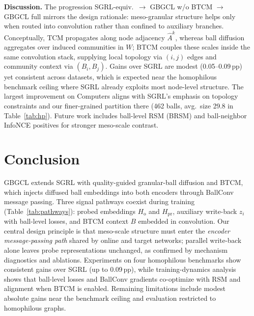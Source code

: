 \documentclass[conference]{IEEEtran}
\begin{document}
\textbf{Discussion.}
The progression SGRL-equiv.\ $\rightarrow$ GBGCL w/o BTCM $\rightarrow$ GBGCL full mirrors the design rationale: meso-granular structure helps only when routed into convolution rather than confined to auxiliary branches.
Conceptually, TCM propagates along node adjacency $\hat{A}^{k}$, whereas ball diffusion aggregates over induced communities in $W$; BTCM couples these scales inside the same convolution stack, supplying local topology via $(i,j)$ edges and community context via $(B_i,B_j)$.
Gains over SGRL are modest (0.05--0.09\,pp) yet consistent across datasets, which is expected near the homophilous benchmark ceiling where SGRL already exploits most node-level structure.
The largest improvement on Computers aligns with SGRL's emphasis on topology constraints and our finer-grained partition there (462 balls, avg.\ size 29.8 in Table~\ref{tab:hp}).
Future work includes ball-level RSM (BRSM) and ball-neighbor InfoNCE positives for stronger meso-scale contrast.

\section{Conclusion}
\label{sec:conclusion}

GBGCL extends SGRL with quality-guided granular-ball diffusion and BTCM, which injects diffused ball embeddings into both encoders through BallConv message passing.
Three signal pathways coexist during training (Table~\ref{tab:pathways}): probed embeddings $H_{\mathrm{o}}$ and $H_{\mathrm{pr}}$, auxiliary write-back $z_i$ with ball-level losses, and BTCM context $B$ embedded in convolution.
Our central design principle is that meso-scale structure must enter the \emph{encoder message-passing path} shared by online and target networks; parallel write-back alone leaves probe representations unchanged, as confirmed by mechanism diagnostics and ablations.
Experiments on four homophilous benchmarks show consistent gains over SGRL (up to 0.09\,pp), while training-dynamics analysis shows that ball-level losses and BallConv gradients co-optimize with RSM and alignment when BTCM is enabled.
Remaining limitations include modest absolute gains near the benchmark ceiling and evaluation restricted to homophilous graphs.
\end{document}
